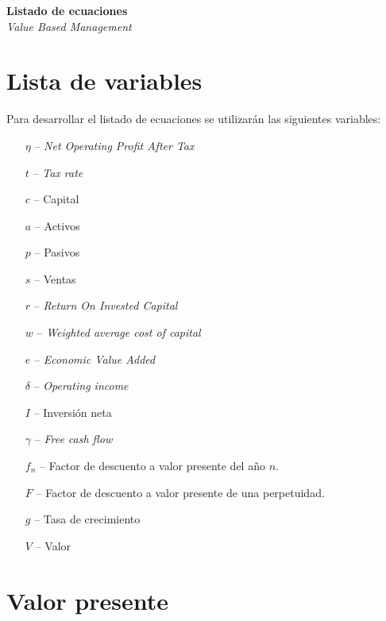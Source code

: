 \begin{center}
    {\huge \textbf{Listado de ecuaciones}}\\
    \vspace{0.5cm}
    {\large \textit{Value Based Management}}
\end{center}

\begin{multicols}{2}

\section{Lista de variables}
Para desarrollar el listado de ecuaciones se utilizarán las siguientes variables:

\begin{itemize}
    \item [$\eta$ \---] \textit{Net Operating Profit After Tax}
    \item [$t$ \---] \textit{Tax rate}
    \item [$c$ \---] Capital
    \item [$a$ \---] Activos
    \item [$p$ \---] Pasivos
    \item [$s$ \---] Ventas
    \item [$r$ \---] \textit{Return On Invested Capital}
    \item [$w$ \---] \textit{Weighted average cost of capital}
    \item [$e$ \---] \textit{Economic Value Added}
    \item [$\delta$ \---] \textit{Operating income}
    \item [$I$ \---] Inversión neta
    \item [$\gamma$ \---] \textit{Free cash flow}
    \item [$f_n$ \---] Factor de descuento a valor presente del año $n$.
    \item [$F$ \---] Factor de descuento a valor presente de una perpetuidad.
    \item [$g$ \---] Tasa de crecimiento
    \item [$V$ \---] Valor
\end{itemize}

\section{Valor presente}


\end{multicols}
